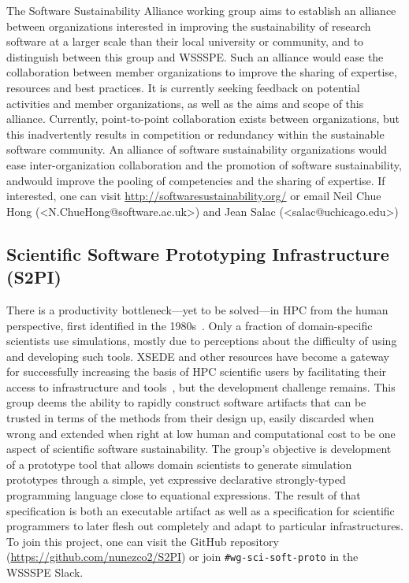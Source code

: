 \documentclass[11pt, oneside]{amsart}
\newcommand{\note}[1]{ {\textcolor{blueish}    { ***Note:      #1 }}}
\begin{document}

The Software Sustainability Alliance working group aims to establish an alliance between organizations interested in improving the sustainability of research software at a larger scale than their local university or community, and to distinguish between this group and WSSSPE. Such an alliance would ease the collaboration between member organizations to improve the sharing of expertise, resources and best practices. It is currently seeking feedback on potential activities and member organizations, as well as the aims and scope of this alliance.
Currently, point-to-point collaboration exists between organizations, but this inadvertently results in competition or redundancy within the sustainable software community. An alliance of software sustainability organizations would ease inter-organization collaboration and the promotion of software sustainability, andwould improve the pooling of competencies and the sharing of expertise. 
If interested, one can visit \url{http://softwaresustainability.org/} or email Neil Chue Hong (<N.ChueHong@software.ac.uk>) and Jean Salac (<salac@uchicago.edu>)


\subsection{Scientific Software Prototyping Infrastructure (S2PI)}
\label{sec:prototyping}

There is a productivity bottleneck---yet to be solved---in HPC from the human
perspective, first identified in the 1980s~\cite{barstow1982automatic}. Only a fraction of
domain-specific scientists use simulations, mostly due to
perceptions about the difficulty of using and developing such tools.
XSEDE and other resources have become a gateway for successfully increasing the
basis of HPC scientific users by facilitating their access to infrastructure and
tools~\cite{towns2014xsede}, but the development challenge remains.
%
This group deems the ability to rapidly construct software artifacts that can be
trusted in terms of the methods from their design up, easily discarded when
wrong and extended when right at low human and computational cost to be one
aspect of scientific software sustainability.
%
The group's objective is development of a prototype tool that allows domain scientists to generate
simulation prototypes through a simple, yet expressive declarative
strongly-typed programming language close to equational expressions. The result
of that specification is both an executable artifact as well as a specification
for scientific programmers to later flesh out completely and adapt to particular
infrastructures. 
%
To join this project, one can visit the GitHub repository 
(\url{https://github.com/nunezco2/S2PI}) or join \texttt{\#wg-sci-soft-proto} in the WSSSPE Slack.
\end{document}
